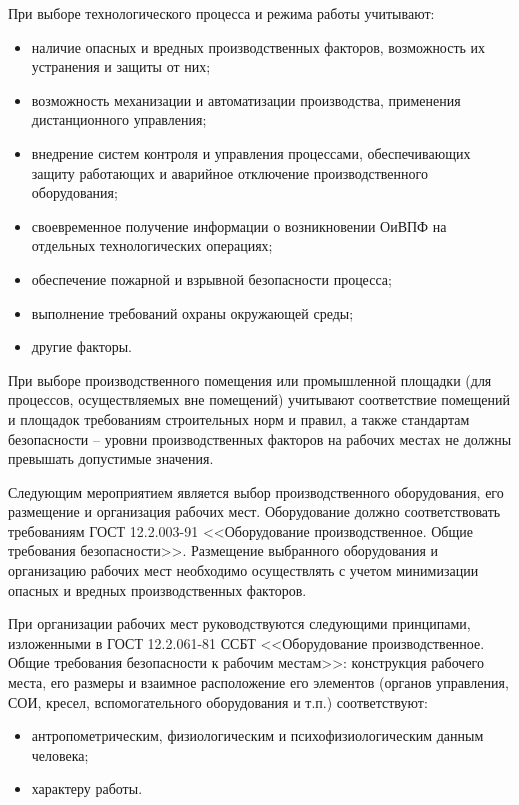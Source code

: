         При выборе технологического процесса и режима работы  учитывают: 
        \begin{itemize}
            \item наличие опасных и вредных производственных факторов,
                возможность их устранения и защиты от них;
            \item возможность механизации и автоматизации производства,
                применения дистанционного управления;
            \item внедрение систем контроля и управления процессами,
                обеспечивающих защиту работающих и аварийное отключение
                производственного оборудования;
            \item своевременное получение информации о возникновении ОиВПФ на
                отдельных технологических операциях;
            \item обеспечение пожарной и взрывной безопасности процесса;
            \item выполнение требований охраны окружающей среды;
            \item другие факторы.
        \end{itemize}

        При выборе производственного помещения или промышленной площадки (для
        процессов, осуществляемых вне помещений) учитывают соответствие
        помещений и площадок требованиям строительных норм и правил, а также
        стандартам безопасности – уровни производственных факторов на рабочих
        местах не должны превышать допустимые значения. 

        Следующим мероприятием является выбор производственного оборудования,
        его размещение и организация рабочих мест. Оборудование должно
        соответствовать требованиям ГОСТ 12.2.003-91 <<Оборудование
        производственное. Общие требования безопасности>>.  Размещение
        выбранного оборудования и организацию рабочих мест необходимо
        осуществлять с учетом минимизации опасных и вредных производственных
        факторов. 

        При организации рабочих мест руководствуются следующими принципами,
        изложенными в ГОСТ 12.2.061-81 ССБТ <<Оборудование производственное.
        Общие требования безопасности к рабочим местам>>: конструкция рабочего
        места, его размеры и взаимное расположение его элементов (органов
        управления, СОИ, кресел, вспомогательного оборудования и т.п.)
        соответствуют:
        \begin{itemize}
            \item антропометрическим, физиологическим и психофизиологическим
            данным человека;
            \item характеру работы.
        \end{itemize}

